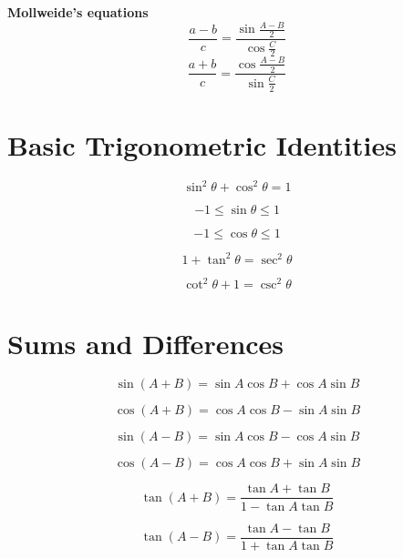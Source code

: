 \documentclass[a4paper]{book}
\begin{document}
\textbf{Mollweide's equations}
\begin{equation}
\frac{a - b}{c} = \frac{\sin \frac{A - B}{2}}{\cos \frac{C}{2}}
\end{equation}
\begin{equation}
\frac{a + b}{c} = \frac{\cos \frac{A - B}{2}}{\sin \frac{C}{2}}
\end{equation}

\section{Basic Trigonometric Identities}
\begin{description}
\item \begin{equation}  \sin^2 \theta + \cos^2 \theta  = 1  \end{equation}
\item \begin{equation} -1 \le \sin \theta \le 1 \end{equation}
\item \begin{equation} -1 \le \cos \theta \le 1 \end{equation}
\item \begin{equation} 1 + \tan^2 \theta = \sec^2 \theta \end{equation}
\item \begin{equation} \cot^2 \theta + 1 = \csc^2 \theta \end{equation}
\end{description}

\section{Sums and Differences}
\begin{description}
\item \begin{equation} \sin (A + B) = \sin A \cos B + \cos A \sin B \end{equation}
\item \begin{equation} \cos (A + B) = \cos A \cos B - \sin A \sin B \end{equation}
\item \begin{equation} \sin (A - B) = \sin A \cos B - \cos A \sin B \end{equation}
\item \begin{equation} \cos (A - B) = \cos A \cos B + \sin A \sin B \end{equation}
\item \begin{equation} \tan (A + B) = \frac{\tan A + \tan B}{1 - \tan A \tan B} \end{equation}
\item \begin{equation} \tan (A - B) = \frac{\tan A - \tan B}{1 + \tan A \tan B}  \end{equation}
\end{description}
\end{document}
